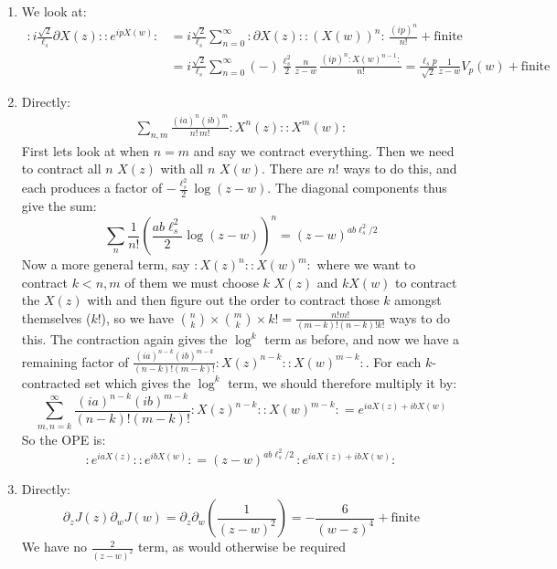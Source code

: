 \documentclass[11pt]{article}
\begin{document}
\begin{enumerate}
	I can't help but think that this might have \emph{something} to do with the Schwarzian. 
	
	\item We look at:
	\[
	\begin{aligned}
		:i \frac{\sqrt 2}{\ell_s} \partial X(z): :e^{i p X(w)}: 
		&= i \frac{\sqrt 2}{\ell_s} \sum_{n=0}^\infty :\partial X(z): :(X(w))^n: \, \frac{(i p)^n}{n!} + \text{finite}\\
		&= i \frac{\sqrt 2}{\ell_s} \sum_{n=0}^\infty (-) \frac{\ell_s^2}{2} \frac{n}{z-w} \, \frac{(i p)^n :X(w)^{n-1}:}{n!} = \frac{\ell_s p}{\sqrt2} \frac{1}{z-w} V_p(w) + \text{finite}
	\end{aligned}
	\]
	
	\item Directly:
	\[
	\begin{aligned}
		\sum_{n, m} \frac{(i a)^n (i b)^m}{n!\, m!} :X^n(z): :X^m(w):
	\end{aligned}
	\]
	First lets look at when $n = m$ and say we contract everything. Then we need to contract all $n$ $X(z)$ with all $n$ $X(w)$. There are $n!$ ways to do this, and each produces a factor of $-\frac{\ell_s^2}{2} \log (z-w)$. The diagonal components thus give the sum:
	\[
		\sum_n \frac{1}{n!} \left(\frac{ab \ell_s^2}{2} \log (z-w) \right)^n = (z-w)^{a b \ell_s^2/2}
	\]
	Now a more general term, say $:X(z)^n: :X(w)^m:$ where we want to contract $k < n,m$ of them we must choose $k$ $X(z)$ and $k X(w)$ to contract the $X(z)$ with and then figure out the order to contract those $k$ amongst themselves ($k!$), so we have ${n \choose k} \times {m \choose k} \times k! = \frac{n! m!}{(m-k)! (n-k)! k!}$ ways to do this. The contraction again gives the $\log^k$ term as before, and now we have a remaining factor of $\frac{(ia)^{n-k} (ib)^{m-k}}{(n-k)! (m-k)!} :X(z)^{n-k}: :X(w)^{m-k}:$. For each $k$-contracted set which gives the $\log^k$ term, we should therefore multiply it by:
	\[
		\sum_{m,n=k}^\infty \frac{(ia)^{n-k} (ib)^{m-k}}{(n-k)! (m-k)!} :X(z)^{n-k}: :X(w)^{m-k}: = e^{i a X(z) + i b X(w)}
	\]
	So the OPE is:
	\[
		:e^{i a X(z)}: :e^{i b X(w)}: = (z-w)^{a b \ell_s^2/2}\, :e^{i a X(z) + i b X(w)}:
	\]
	
	\item Directly:
	\[
		\partial_z J(z) \partial_w J(w) = \partial_z \partial_w \left(\frac{1}{(z-w)^2} \right) = -\frac{6}{(w-z)^4} + \text{finite}
	\]
	We have no $\frac{2}{(z-w)^2}$ term, as would otherwise be required
	

\end{enumerate}
\end{document}
